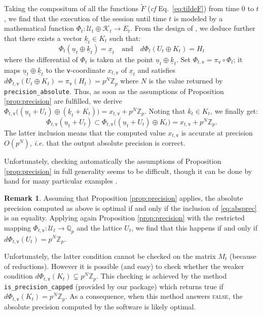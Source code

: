 \documentclass[sigconf]{acmart}
\newcommand{\Z}{\mathbb Z}
\newcommand{\Zp}{\Z_p}
\newcommand{\Q}{\mathbb Q}
\newcommand{\Qp}{\Q_p}
\newcommand{\ttv}{\texttt{v}\xspace}
\newcommand{\calU}{\mathcal{U}}
\newcommand{\calK}{\mathcal{K}}
\newcommand{\ZpLC}{\text{\color{output} \rm \tt ZpLC}\xspace}
\theoremstyle{definition}
\newtheorem{rmk}[theo]{Remark}
\begin{document}
Taking the compositum of all the functions $\tilde F$ (\emph{cf} 
Eq.~\eqref{eq:tildeF}) from time $0$ to $t$, we find that the execution 
of the session until time $t$ is modeled by a mathematical function
$\Phi_t : \calU_t \oplus \calK_t \to E_t$.
From the design of \ZpLC, we deduce further that there exists a 
vector $\underline k_t \in K_t$ such that:
$$\Phi_t(\underline u_t \oplus \underline k_t) = \underline x_t 
\quad \text{and} \quad
d\Phi_t (U_t \oplus K_t) = H_t$$
where the differential of $\Phi_t$ is taken at the point
$\underline u_t \oplus \underline k_t$. 
Set $\Phi_{t,\ttv} = \pi_\ttv \circ \Phi_t$; it maps 
$\underline u_t \oplus \underline k_t$ to the \ttv-coordinate 
$x_{t,\ttv}$ of $\underline x_t$ and satisfies
$d\Phi_{t,\ttv} (U_t \oplus K_t) = \pi_\ttv(H_t) = p^N \Zp$
where $N$ is the value returned by {\color{method}\verb?precision_absolute?}. Thus, 
as soon as the assumptions of Proposition \ref{prop:precision} are
fulfilled, we derive
$\Phi_{t,\ttv} \big((\underline u_t + U_t) \oplus (\underline k_t + K_t)\big) = 
x_{t,\ttv} + p^N \Zp$.
Noting that $k_t \in K_t$, we finally get:
\begin{equation}
\label{eq:absprec}
\Phi_{t,\ttv} (\underline u_t + U_t) \subset
\Phi_{t,\ttv} \big((\underline u_t + U_t) \oplus K_t\big) = 
x_{t,\ttv} + p^N \Zp.
\end{equation}
The latter inclusion means that the computed value $x_{t,\ttv}$ is
accurate at precision $O(p^N)$, \emph{i.e.} that the output absolute
precision is correct. 

Unfortunately, checking automatically the assumptions of Proposition 
\ref{prop:precision} in full generality seems to be difficult, though it 
can be done by hand for many particular examples
\cite{caruso-roe-vaccon:14a, caruso:2017, LV16}.

\begin{rmk}
Assuming that Proposition \ref{prop:precision} applies, 
the absolute precision computed as above is optimal if and only if
the inclusion of \eqref{eq:absprec} is an equality. Applying again
Proposition \ref{prop:precision}
with the restricted mapping $\Phi_{t,\ttv} : \calU_t \to \Qp$ and the
lattice $U_t$, we find that this happens if and only if
$d\Phi_{t,\ttv}(U_t) = p^N \Zp$.

Unfortunately, the latter condition cannot be checked on the matrix 
$M_t$ (because of reductions). 
However it is possible (and easy) to check whether the weaker condition 
$d\Phi_{t,\ttv}(K_t) \subsetneq p^N \Zp$. This checking is achieved by 
the method
{\color{method}\verb?is_precision_capped?} (provided by our package) which returns true 
if $d\Phi_{t,\ttv}(K_t) = p^N \Zp$. As a consequence, when this method
answers \textsc{false}, the absolute precision computed by the software 
is likely optimal.
\end{rmk}
\end{document}
